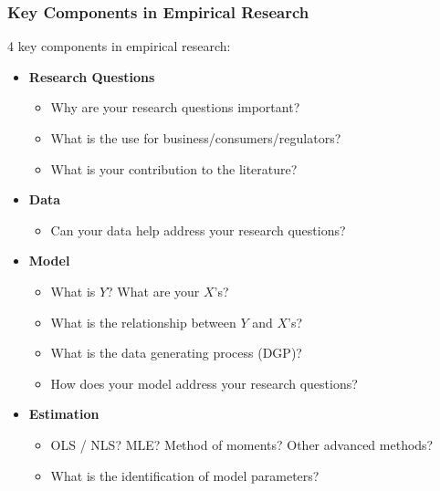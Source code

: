 \documentclass[10pt]{beamer}
\begin{document}
\begin{frame}
\frametitle{Key Components in Empirical Research}
4 key components in empirical research:
\begin{itemize}
    \item \textbf{Research Questions}
    \begin{itemize}
        \item Why are your research questions important?
        \item What is the use for business/consumers/regulators?
        \item What is your contribution to the literature?
    \end{itemize}
    
    \item \textbf{Data}
    \begin{itemize}
        \item Can your data help address your research questions?
    \end{itemize}
    
    \item \textbf{Model}
    \begin{itemize}
        \item What is \(Y\)? What are your \(X\)'s?
        \item What is the relationship between \(Y\) and \(X\)'s?
        \item What is the data generating process (DGP)?
        \item How does your model address your research questions?
    \end{itemize}
    
    \item \textbf{Estimation}
    \begin{itemize}
        \item OLS / NLS? MLE? Method of moments? Other advanced methods?
        \item What is the identification of model parameters?
    \end{itemize}
\end{itemize}
\end{frame}
\end{document}

